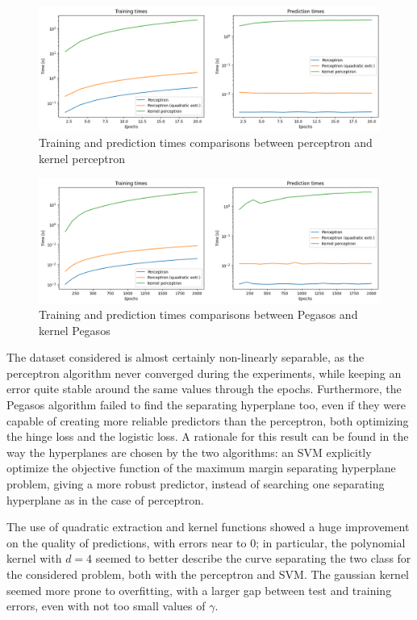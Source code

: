 \documentclass{article}
\begin{document}
\begin{figure}
	\centering
	\includegraphics[width=\columnwidth]{../plots/time_perceptron.png}
	\caption{Training and prediction times comparisons between perceptron and kernel perceptron}
	\label{fig:time_perceptron}
\end{figure}
\begin{figure}
	\centering
	\includegraphics[width=\columnwidth]{../plots/time_svm.png}
	\caption{Training and prediction times comparisons between Pegasos and kernel Pegasos}
	\label{fig:time_svm}
\end{figure}

The dataset considered is almost certainly non-linearly separable, as the perceptron algorithm never converged during the experiments, while keeping an error quite stable around the same values through the epochs. Furthermore, the Pegasos algorithm failed to find the separating hyperplane too, even if they were capable of creating more reliable predictors than the perceptron, both optimizing the hinge loss and the logistic loss. A rationale for this result can be found in the way the hyperplanes are chosen by the two algorithms: an SVM explicitly optimize the objective function of the maximum margin separating hyperplane problem, giving a more robust predictor, instead of searching one separating hyperplane as in the case of perceptron. 

The use of quadratic extraction and kernel functions showed a huge improvement on the quality of predictions, with errors near to 0; in particular, the polynomial kernel with $d=4$ seemed to better describe the curve separating the two class for the considered problem, both with the perceptron and SVM. The gaussian kernel seemed more prone to overfitting, with a larger gap between test and training errors, even with not too small values of $\gamma$. 
\end{document}
